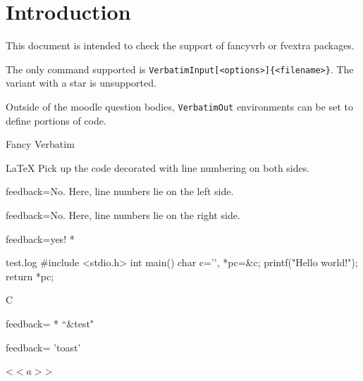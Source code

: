 \documentclass{article}
\newif\iffvextra
\begin{document}
\section*{Introduction}

This document is intended to check the support of \textsf{fancyvrb} or  
\textsf{fvextra} packages.

The only command supported is \texttt{VerbatimInput[<options>]\{<filename>\}}.
The variant with a star is unsupported.

Outside of the moodle question bodies, \texttt{VerbatimOut} environments can be 
set to define portions of code.

\begin{quiz}{Fancy Verbatim}

\begin{multi}{LaTeX}
Pick up the code decorated with line numbering on both sides.
\item[feedback={No. Here, line numbers lie on the left side.}] 
\item[feedback={No. Here, line numbers lie on the right side.}] 
\item[feedback={yes!}]* 
\end{multi}

\begin{filecontents*}[overwrite]{test.log}
#include <stdio.h>
int main() {
    char c='\0', *pc=&c;
    printf("Hello world!\n");
    return *pc;
}
\end{filecontents*}
\begin{multi}{C}

\item[feedback={}]* ``\&test"
\item[feedback={}] 'toast'
\item <$<a>$>
\end{multi}

\end{quiz}
\end{document}
